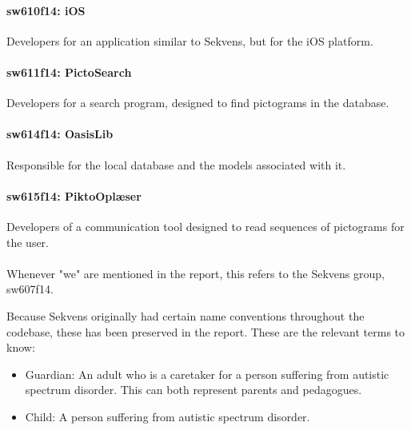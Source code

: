 \paragraph{sw610f14: iOS}
Developers for an application similar to Sekvens, but for the iOS platform.
\paragraph{sw611f14: PictoSearch}
Developers for a search program, designed to find pictograms in the database.
\paragraph{sw614f14: OasisLib}
Responsible for the local database and the models associated with it.
\paragraph{sw615f14: PiktoOplæser}
Developers of a communication tool designed to read sequences of pictograms for the user.\\
\\

Whenever "we" are mentioned in the report, this refers to the Sekvens group, sw607f14.

Because Sekvens originally had certain name conventions throughout the codebase, these has been preserved in the report. These are the relevant terms to know:

\begin{itemize}
\item Guardian: An adult who is a caretaker for a person suffering from autistic spectrum disorder. This can both represent parents and pedagogues.
\item Child: A person suffering from autistic spectrum disorder.
\end{itemize}